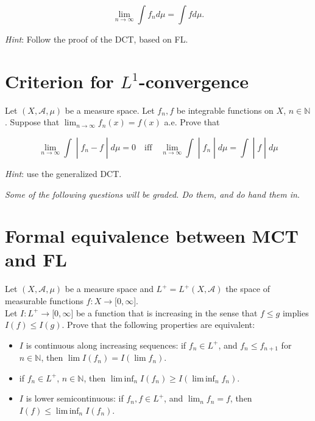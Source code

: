 \[\lim\limits_{n\rightarrow\infty}\int f_{n} d\mu = \int f d\mu.\]

\emph{Hint}: Follow the proof of the DCT, based on FL.

\section{\texorpdfstring{Criterion for \(L^{1}\)-convergence}{Criterion for L\^{}\{1\}-convergence}}\label{criterion-for-l1-convergence}

Let \((X,\mathcal{A},\mu)\) be a measure space. Let \(f_{n},f\) be integrable functions on \(X\), \(n \in \mathbb{N}\). Suppose that \(\lim_{n\rightarrow\infty}f_{n}(x) = f(x)\) a.e. Prove that

\[\left. \lim\limits_{n\rightarrow\infty}\int \middle| f_{n} - f \middle| d\mu = 0\quad\text{iff}\quad\lim\limits_{n\rightarrow\infty}\int \middle| f_{n} \middle| d\mu = \int \middle| f \middle| d\mu \right.\]

\emph{Hint}: use the generalized DCT.

\emph{Some of the following questions will be graded. Do them, and do hand them in}.

\section{Formal equivalence between MCT and FL}\label{formal-equivalence-between-mct-and-fl}

Let \((X,\mathcal{A},\mu)\) be a measure space and \(L^{+} = L^{+}(X,\mathcal{A})\) the space of measurable functions \(f:X\rightarrow\lbrack 0,\infty\rbrack\).\\
Let \(I:L^{+}\rightarrow\lbrack 0,\infty\rbrack\) be a function that is increasing in the sense that \(f \leq g\) implies \(I(f) \leq I(g)\). Prove that the following properties are equivalent:

\begin{itemize}
\item
  \(I\) is continuous along increasing sequences: if \(f_{n} \in L^{+}\), and \(f_{n} \leq f_{n + 1}\) for \(n \in \mathbb{N}\), then \(\lim I(f_{n}) = I(\lim f_{n})\).
\item
  if \(f_{n} \in L^{+}\), \(n \in \mathbb{N}\), then \(\operatorname{lim\, inf}_{n}I(f_{n}) \geq I(\operatorname{lim\, inf}_{n}f_{n})\).
\item
  \(I\) is lower semicontinuous: if \(f_{n},f \in L^{+}\), and \(\lim_{n}f_{n} = f\), then \(I(f) \leq \operatorname{lim\, inf}_{n}I(f_{n})\).
\end{itemize}

